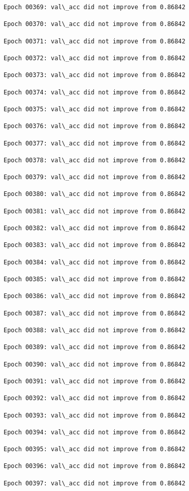 \documentclass[11pt]{article}
\begin{document}
\begin{Verbatim}[commandchars=\\\{\}]
Epoch 00369: val\_acc did not improve from 0.86842

Epoch 00370: val\_acc did not improve from 0.86842

Epoch 00371: val\_acc did not improve from 0.86842

Epoch 00372: val\_acc did not improve from 0.86842

Epoch 00373: val\_acc did not improve from 0.86842

Epoch 00374: val\_acc did not improve from 0.86842

Epoch 00375: val\_acc did not improve from 0.86842

Epoch 00376: val\_acc did not improve from 0.86842

Epoch 00377: val\_acc did not improve from 0.86842

Epoch 00378: val\_acc did not improve from 0.86842

Epoch 00379: val\_acc did not improve from 0.86842

Epoch 00380: val\_acc did not improve from 0.86842

Epoch 00381: val\_acc did not improve from 0.86842

Epoch 00382: val\_acc did not improve from 0.86842

Epoch 00383: val\_acc did not improve from 0.86842

Epoch 00384: val\_acc did not improve from 0.86842

Epoch 00385: val\_acc did not improve from 0.86842

Epoch 00386: val\_acc did not improve from 0.86842

Epoch 00387: val\_acc did not improve from 0.86842

Epoch 00388: val\_acc did not improve from 0.86842

Epoch 00389: val\_acc did not improve from 0.86842

Epoch 00390: val\_acc did not improve from 0.86842

Epoch 00391: val\_acc did not improve from 0.86842

Epoch 00392: val\_acc did not improve from 0.86842

Epoch 00393: val\_acc did not improve from 0.86842

Epoch 00394: val\_acc did not improve from 0.86842

Epoch 00395: val\_acc did not improve from 0.86842

Epoch 00396: val\_acc did not improve from 0.86842

Epoch 00397: val\_acc did not improve from 0.86842


\end{Verbatim}
\end{document}
